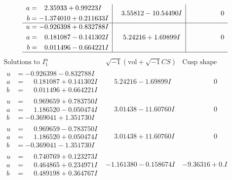 \documentclass[1p]{elsarticle_modified}
\theoremstyle{definition}
\newcommand{\I}{\sqrt{-1}}
\begin{document}
$$\begin{array}{c|c|c}
\begin{aligned}
a &= \phantom{-}2.35933 + 0.99223 I \\
b &= -1.374010 + 0.211633 I\end{aligned}
 & \phantom{-}3.55812 - 10.54490 I & \phantom{-0.000000 } 0 \\ \hline\begin{aligned}
u &= -0.926398 + 0.832788 I \\
a &= \phantom{-}0.181087 - 0.141302 I \\
b &= \phantom{-}0.011496 - 0.664221 I\end{aligned}
 & \phantom{-}5.24216 + 1.69899 I & \phantom{-0.000000 } 0\\
 \hline 
 \end{array}$$\newpage$$\begin{array}{c|c|c}  
\text{Solutions to }I^u_{1}& \I (\text{vol} + \sqrt{-1}CS) & \text{Cusp shape}\\
 \hline 
\begin{aligned}
u &= -0.926398 - 0.832788 I \\
a &= \phantom{-}0.181087 + 0.141302 I \\
b &= \phantom{-}0.011496 + 0.664221 I\end{aligned}
 & \phantom{-}5.24216 - 1.69899 I & \phantom{-0.000000 } 0 \\ \hline\begin{aligned}
u &= \phantom{-}0.969659 + 0.783750 I \\
a &= \phantom{-}1.186520 - 0.050474 I \\
b &= -0.369041 + 1.351730 I\end{aligned}
 & \phantom{-}3.01438 - 11.60760 I & \phantom{-0.000000 } 0 \\ \hline\begin{aligned}
u &= \phantom{-}0.969659 - 0.783750 I \\
a &= \phantom{-}1.186520 + 0.050474 I \\
b &= -0.369041 - 1.351730 I\end{aligned}
 & \phantom{-}3.01438 + 11.60760 I & \phantom{-0.000000 } 0 \\ \hline\begin{aligned}
u &= \phantom{-}0.740769 + 0.123273 I \\
a &= \phantom{-}0.464865 + 0.234971 I \\
b &= \phantom{-}0.489198 + 0.364767 I\end{aligned}
 & -1.161380 - 0.158674 I & -9.36316 + 0. I\phantom{ +0.000000I} \\ \hline\begin{aligned}

\end{aligned}
\end{array}$$
\end{document}
